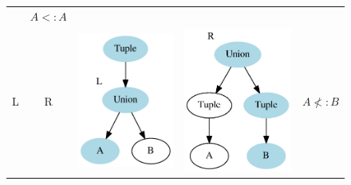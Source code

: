 \documentclass[a4paper,english]{lipics-v2019}
\newcommand{\goodcell}{\cellcolor{green!25}}
\newcommand{\badcell}{\cellcolor{red!25}}
\begin{document}
\begin{figure}[h]
\begin{tabular}{cc|cc|c}
    & \goodcell ${A} <: {A}$ \\
\goodcell L & \badcell R & \badcell \includegraphics[scale=0.3]{figures-gen/left1.pdf} & \badcell \includegraphics[scale=0.3]{figures-gen/right2.pdf}  
    & \badcell ${A} \not<: {B}$ \\
\hline

\end{tabular}
\end{figure}
\end{document}

